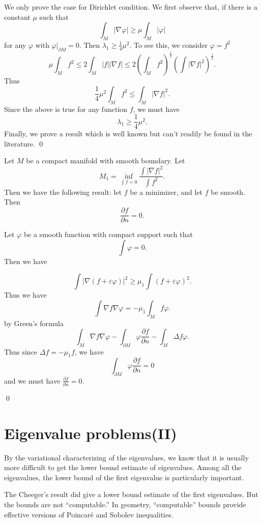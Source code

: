  We only prove the case for Dirichlet condition. We first observe that, if there is a constant $\mu$ such that 
%
\[ \int_M |\nabla \varphi | \geq \mu \int_M |\varphi | \]
%
for any  $ \varphi $ with $ \varphi |_{\partial M} = 0 $. Then $ \lambda _1 \geq \frac{1}{4} \mu^2 $. To 
see this, we consider $ \varphi = f^2 $ 
%
\[ \mu \int _M f^2 \leq 2 \int_M |f| | \nabla f|\leq 2 \left( \int_M f^2 \right) ^{\frac{1}{2}} \left( \int |\nabla f|^2 \right) ^{\frac{1}{2}}.\]
%
Thus
%
\[ \frac{1}{4} \mu^2 \int_M f ^2 \leq \int_M | \nabla f|^2.\]
%
Since the above is true for any function $f$, we must have 
%
\[ \lambda _1 \geq \frac{1}{4} \mu ^2 .\]
%
Finally, we prove a result which is well known but can't readily be found in the literature.
\qed

\begin{theorem} Let $M$ be a compact manifold with smooth boundary. Let 
%
\[ M_1 = \inf_{\int f = 0} \frac{\int | \nabla f|^2}{\int f ^2} .\]
%
Then we have the following result: let $f$ be a minimizer, and let $f$ be smooth. Then
%
\[\frac{\partial f }{\partial n} = 0. \]
\end{theorem}

 Let $ \varphi $ be a smooth function with compact support such that 
%
\[ \int \varphi = 0. \]
%
Then we have 

\[ \int |\nabla (f + \varepsilon \varphi )|^2 \geq \mu_1 \int (f + \varepsilon \varphi )^2 .\]
%
Thus we have
%
\[ \int \nabla f \nabla \varphi = - \mu _1 \int_M f \varphi.\]
%
by Green's formula
%
\[ \int_M \nabla f \nabla \varphi - \int _{\partial M} \varphi \frac{\partial f }{\partial n} - \int_M \Delta f \varphi.\]
%
Thus since $ \Delta f = - \mu_1 f $, we have 
%
\[ \int_{\partial M} \varphi\frac{\partial f }{\partial n}  = 0 \]
%
and we must have $ \frac{\partial f }{\partial n}  = 0 $.

\qed


\section{Eigenvalue problems(II)}

By the variational characterizing of the eigenvalues, we know that it is usually more difficult to get the lower bound estimate of eigenvalues. Among all the eigenvalues, the lower bound of the first eigenvalue is particularly important.

The Cheeger's result did give a lower bound estimate of the first eigenvalues. But the bounds are not ``computable.'' In geometry, ``computable'' bounds provide effective versions of Poincar\'{e} and Sobolev inequalities.

